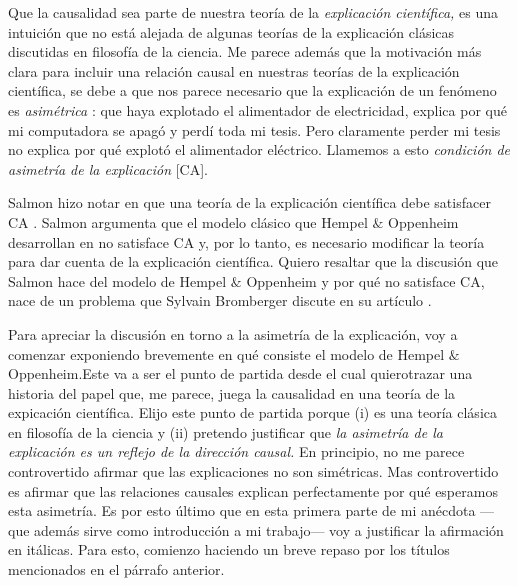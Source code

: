 Que la causalidad sea parte de nuestra teoría de la
\emph{explicación científica,} es una intuición que no
está alejada de algunas teorías de la explicación
clásicas discutidas en filosofía de la ciencia. Me
parece además que la motivación más clara para incluir
una relación causal en nuestras teorías de la
explicación científica, se debe a que nos parece
necesario que la explicación de un fenómeno es \emph{
asimétrica }: que haya explotado el alimentador de
electricidad, explica por qué mi computadora se apagó
y perdí toda mi tesis. Pero claramente perder mi tesis
no explica por qué explotó el alimentador eléctrico.
Llamemos a esto \emph{condición de asimetría de la
explicación} [CA]. 

Salmon hizo notar en  que una
teoría de la explicación científica debe satisfacer CA
. Salmon argumenta que el
modelo clásico que Hempel $\&$ Oppenheim desarrollan en
 no satisface CA y, por lo
tanto, es necesario modificar la teoría para dar
cuenta de la explicación científica. Quiero resaltar
que la discusión que Salmon hace del modelo de Hempel
$\&$ Oppenheim y por qué no satisface CA, nace de un
problema que Sylvain Bromberger discute en su artículo
.

Para apreciar la discusión en torno a la asimetría de la explicación, voy a comenzar exponiendo brevemente en qué consiste el modelo de Hempel $\&$ Oppenheim.Este va a ser el punto de partida desde el cual quierotrazar una historia del papel que, me parece, juega la
causalidad en una teoría de la expicación científica.
Elijo este punto de partida porque (i) es una
teoría clásica en filosofía de la ciencia y (ii)
pretendo justificar que \emph{la asimetría de la
explicación es un reflejo de la dirección causal.}
En principio, no me parece controvertido afirmar que
las explicaciones no son simétricas. Mas controvertido
es afirmar que las relaciones causales explican
perfectamente por qué esperamos esta asimetría. Es por
esto último que en esta primera parte de mi anécdota
---que además sirve como introducción a mi trabajo---
voy a justificar la afirmación en itálicas. Para esto,
comienzo haciendo un breve repaso por los títulos
mencionados en el párrafo anterior.



